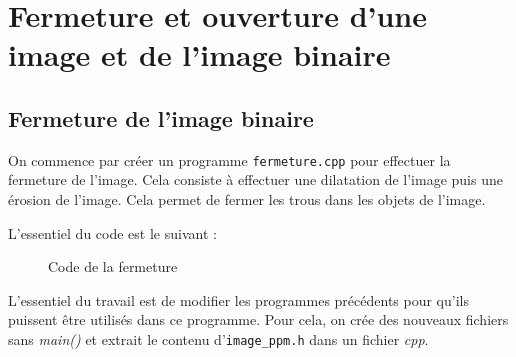 \documentclass[french,a4paper,10pt]{article}
\begin{document}
	\newpage
	\section{Fermeture et ouverture d'une image et de l'image binaire}\label{sec:3}

	\subsection{Fermeture de l'image binaire}\label{subsec:3.1}

	On commence par créer un programme \texttt{fermeture.cpp} pour effectuer la fermeture de l'image.
	Cela consiste à effectuer une dilatation de l'image puis une érosion de l'image.
	Cela permet de fermer les trous dans les objets de l'image.

	L'essentiel du code est le suivant : %
	\begin{figure}[!htb]
		\centering
		\caption{Code de la fermeture}\label{fig:fermeture-code}
	\end{figure}

	L'essentiel du travail est de modifier les programmes précédents pour qu'ils puissent être utilisés dans ce
	programme.
	Pour cela, on crée des nouveaux fichiers sans \emph{main()} et extrait le contenu d'\texttt{image\_ppm.h} dans un
	fichier \emph{cpp}.
\end{document}
